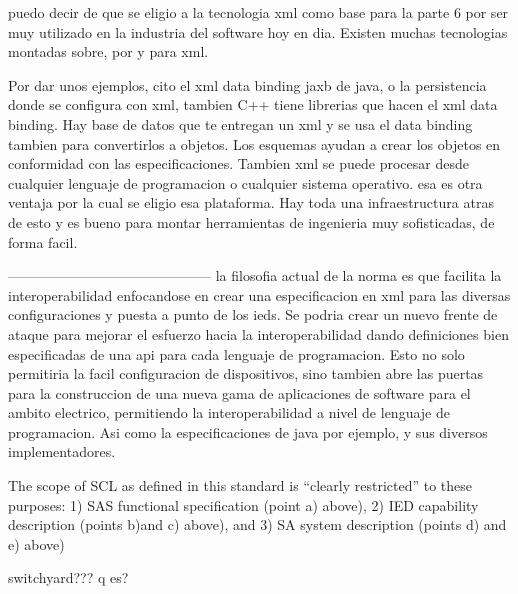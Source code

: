 puedo decir de que se eligio a la tecnologia xml 
como base para la parte 6 por ser muy 
utilizado en la industria del software hoy en dia.
Existen muchas tecnologias montadas sobre, por y 
para xml. 

Por dar unos ejemplos, cito el xml data binding jaxb de java,
o la persistencia donde se configura con xml, 
tambien C++ tiene librerias que hacen el 
xml data binding.
Hay base de datos que te entregan un xml y 
se usa el data binding tambien para convertirlos 
a objetos.
Los esquemas ayudan a crear los objetos 
en conformidad 
con las especificaciones. 
Tambien xml se puede procesar desde 
cualquier lenguaje de programacion 
o cualquier sistema operativo. esa 
es otra ventaja por la cual se eligio 
esa plataforma. Hay toda una infraestructura 
atras de esto y es bueno para montar 
herramientas de ingenieria muy 
sofisticadas, de forma facil.









--------------------------------------------
la filosofia actual de la norma es que facilita 
la interoperabilidad enfocandose en crear 
una especificacion en xml para las 
diversas configuraciones y puesta a 
punto de los ieds. 
Se podria crear un nuevo frente de 
ataque para mejorar el esfuerzo 
hacia la interoperabilidad dando 
definiciones bien especificadas de 
una api para cada lenguaje de programacion.
Esto no solo permitiria la facil configuracion
de dispositivos, sino tambien abre las 
puertas para la construccion de una nueva gama
de aplicaciones de software para el ambito electrico,
permitiendo la interoperabilidad a nivel 
de lenguaje de programacion. Asi como la 
especificaciones de java por ejemplo, y 
sus diversos implementadores.


The scope of SCL as defined in this standard is ``clearly restricted'' to these purposes:
1)   SAS functional specification (point  a) above),
2)   IED capability description (points  b)and  c) above), and
3)   SA system description (points  d) and  e) above)




switchyard???  q es?